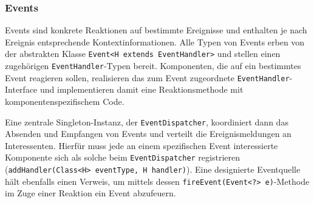         \subsubsection*{Events}
            Events sind konkrete Reaktionen auf bestimmte Ereignisse und enthalten je nach Ereignis entsprechende Kontextinformationen.
            Alle Typen von Events erben von der abstrakten Klasse \lstinline|Event<H extends EventHandler>| und stellen einen
            zugehörigen \lstinline|EventHandler|-Typen bereit.
            Komponenten, die auf ein bestimmtes Event reagieren sollen, realisieren das zum Event zugeordnete
            \lstinline|EventHandler|-Interface und implementieren damit eine Reaktionsmethode mit komponentenspezifischem
            Code.

            Eine zentrale Singleton-Instanz, der \lstinline|EventDispatcher|, koordiniert dann das Absenden und Empfangen von Events
            und verteilt die Ereignismeldungen an Interessenten.
            Hierfür muss jede an einem spezifischen Event interessierte Komponente sich als solche beim
            \lstinline|EventDispatcher| registrieren (\lstinline|addHandler(Class<H> eventType, H handler)|).
            Eine designierte Eventquelle hält ebenfalls einen Verweis, um mittels dessen
            \lstinline|fireEvent(Event<?> e)|-Methode im Zuge einer Reaktion ein Event abzufeuern.

%
%            
%
%
%
%
%
%
%            
            

